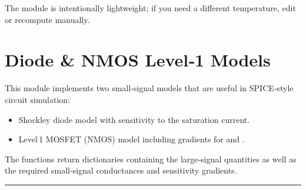 \documentclass[letterpaper,10pt,english]{sphinxmanual}
\begin{document}
\sphinxAtStartPar
The module is intentionally lightweight; if you need a different temperature,
edit {\hyperref[\detokenize{thermal_constants:T}]{}} or recompute {\hyperref[\detokenize{thermal_constants:Vt}]{}} manually.

\sphinxstepscope


\chapter{Diode \& NMOS Level‑1 Models}
\label{\detokenize{diode_mosfet_models:diode-nmos-level1-models}}\label{\detokenize{diode_mosfet_models:diode-and-nmos-models}}\label{\detokenize{diode_mosfet_models::doc}}
\sphinxAtStartPar
This module implements two small‑signal models that are useful in SPICE‑style circuit simulation:
\begin{itemize}
\item {} 
\sphinxAtStartPar
{\hyperref[\detokenize{diode_mosfet_models:evaluate_diode}]{}} \textendash{} Shockley diode model with sensitivity to the saturation current.

\item {} 
\sphinxAtStartPar
{\hyperref[\detokenize{diode_mosfet_models:evaluate_nmos}]{}} \textendash{} Level 1 MOSFET (NMOS) model including gradients for  and .

\end{itemize}

\sphinxAtStartPar
The functions return dictionaries containing the large‑signal quantities as well as the required small‑signal conductances and sensitivity gradients.


\bigskip\hrule\bigskip

\end{document}
